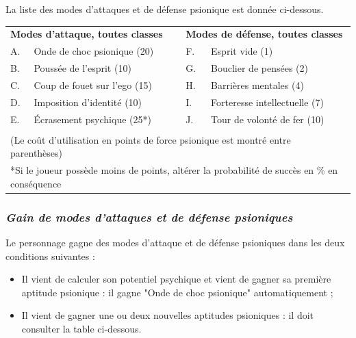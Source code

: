 \documentclass[11pt]{article}
\begin{document}
{La liste des modes d'attaques et de défense psionique est donnée ci-dessous.

\bigskip

{\parindent0.5cm
\begin{tabular}{llcll}
\multicolumn{2}{l}{\textbf{Modes d'attaque, toutes classes}} && \multicolumn{2}{l}{\textbf{Modes de défense, toutes classes}} \\
A. & Onde de choc psionique (20)  && F. & Esprit vide (1) \\
B. & Poussée de l'esprit (10) 	  && G. & Bouclier de pensées (2) \\
C. & Coup de fouet sur l'ego (15) && H. & Barrières mentales (4) \\
D. & Imposition d'identité (10)   && I. & Forteresse intellectuelle (7) \\
E. & Écrasement psychique (25*)   && J. & Tour de volonté de fer (10) \\
&&&& \\
\multicolumn{5}{p{15cm}}{(Le coût d'utilisation en points de force psionique est montré entre parenthèses)} \\
\multicolumn{5}{p{15cm}}{*Si le joueur possède moins de points, altérer la probabilité de succès en \% en conséquence} \\
\end{tabular}}


\subsubsection*{\textit{Gain de modes d'attaques et de défense psioniques}}

Le personnage gagne des modes d'attaque et de défense psioniques dans les deux conditions suivantes :

\bigskip

\begin{itemize}
\item Il vient de calculer son potentiel psychique et vient de gagner sa première aptitude psionique : il gagne "Onde de choc psionique" automatiquement ;
\item Il vient de gagner une ou deux nouvelles aptitudes psioniques : il doit consulter la table ci-dessous.
\end{itemize}

}
\end{document}
